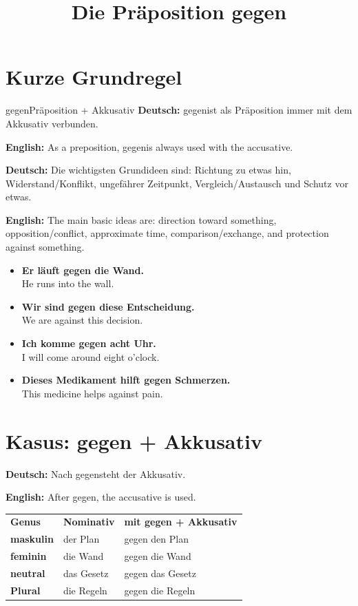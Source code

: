 \documentclass[a4paper,11pt]{article}
\title{Die Präposition \glqq gegen\grqq}
\date{}
\newcommand{\GermanText}[1]{\textbf{Deutsch: }#1\par}
\newcommand{\EnglishText}[1]{{\small\color{SoftGray}\textbf{English: }#1\par}}
\newcommand{\ExampleItem}[2]{\item \textbf{#1}\\{\small\color{SoftGray}#2}}
\begin{document}
    \maketitle
    \tableofcontents
    \newpage

\section{Kurze Grundregel}

\begin{grammarentry}{gegen}{Präposition + Akkusativ}
\GermanText{\glqq gegen\grqq ist als Präposition immer mit dem Akkusativ verbunden.}
\EnglishText{As a preposition, \glqq gegen\grqq is always used with the accusative.}

\GermanText{Die wichtigsten Grundideen sind: Richtung zu etwas hin, Widerstand/Konflikt, ungefährer Zeitpunkt, Vergleich/Austausch und Schutz vor etwas.}
\EnglishText{The main basic ideas are: direction toward something, opposition/conflict, approximate time, comparison/exchange, and protection against something.}
\end{grammarentry}

\begin{exbox}
\begin{itemize}
    \ExampleItem{Er läuft gegen die Wand.}{He runs into the wall.}
    \ExampleItem{Wir sind gegen diese Entscheidung.}{We are against this decision.}
    \ExampleItem{Ich komme gegen acht Uhr.}{I will come around eight o'clock.}
    \ExampleItem{Dieses Medikament hilft gegen Schmerzen.}{This medicine helps against pain.}
\end{itemize}
\end{exbox}

\section{Kasus: gegen + Akkusativ}

\GermanText{Nach \glqq gegen\grqq steht der Akkusativ.}
\EnglishText{After \glqq gegen\grqq, the accusative is used.}

\begin{tabularx}{\textwidth}{>{\bfseries}p{}X X}
\rowcolor{HeaderBlueDark}
\color{white}\textbf{Genus} & \color{white}\textbf{Nominativ} & \color{white}\textbf{mit gegen + Akkusativ} \\
maskulin & der Plan & gegen den Plan \\
feminin & die Wand & gegen die Wand \\
neutral & das Gesetz & gegen das Gesetz \\
Plural & die Regeln & gegen die Regeln \\
\end{tabularx}
\end{document}
